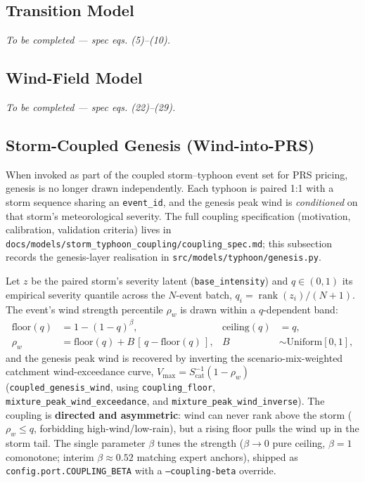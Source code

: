 \documentclass[11pt,a4paper]{article}
\begin{document}
\subsection{Transition Model}

\textit{To be completed — spec eqs. (5)--(10).}

\subsection{Wind-Field Model}

\textit{To be completed — spec eqs. (22)--(29).}

\subsection{Storm-Coupled Genesis (Wind-into-PRS)}
\label{sec:coupled_genesis}

When invoked as part of the coupled storm--typhoon event set for PRS pricing,
genesis is no longer drawn independently. Each typhoon is paired 1:1 with a
storm sequence sharing an \texttt{event\_id}, and the genesis peak wind is
\emph{conditioned} on that storm's meteorological severity. The full coupling
specification (motivation, calibration, validation criteria) lives in
\texttt{docs/models/storm\_typhoon\_coupling/coupling\_spec.md}; this subsection
records the genesis-layer realisation in \texttt{src/models/typhoon/genesis.py}.

Let $z$ be the paired storm's severity latent (\texttt{base\_intensity}) and
$q \in (0,1)$ its empirical severity quantile across the $N$-event batch,
$q_i = \operatorname{rank}(z_i)/(N+1)$. The event's wind strength percentile
$\rho_w$ is drawn within a $q$-dependent band:
\begin{align}
    \text{floor}(q) &= 1 - (1-q)^{\beta}, &
    \text{ceiling}(q) &= q, \\
    \rho_w &= \text{floor}(q) + B\,[\,q - \text{floor}(q)\,], & B &\sim \mathrm{Uniform}[0,1],
\end{align}
and the genesis peak wind is recovered by inverting the scenario-mix-weighted
catchment wind-exceedance curve, $V_{\max} = S_{\text{cat}}^{-1}(1-\rho_w)$
(\texttt{coupled\_genesis\_wind}, using \texttt{coupling\_floor},
\texttt{mixture\_peak\_wind\_exceedance}, and \texttt{mixture\_peak\_wind\_inverse}).
The coupling is \textbf{directed and asymmetric}: wind can never rank above the
storm ($\rho_w \le q$, forbidding high-wind/low-rain), but a rising floor pulls
the wind up in the storm tail. The single parameter $\beta$ tunes the strength
($\beta \to 0$ pure ceiling, $\beta = 1$ comonotone; interim $\beta \approx 0.52$
matching expert anchors), shipped as \texttt{config.port.COUPLING\_BETA} with a
\texttt{--coupling-beta} override.
\end{document}
